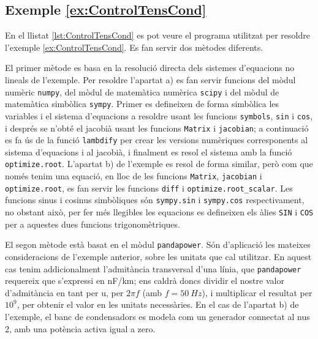 \hypertarget{exemple:ControlTensCond}{\subsection{Exemple \ref*{ex:ControlTensCond} \ControlTensCond}}
En el llistat \vref{lst:ControlTensCond} es pot veure el programa utilitzat per resoldre l'exemple \vref{ex:ControlTensCond}. Es fan servir dos mètodes diferents.

El primer mètode es basa en la resolució directa dels sistemes d'equacions no lineals de l'exemple. Per resoldre l'apartat a)   es fan servir funcions del mòdul numèric \texttt{numpy}, del mòdul de matemàtica numèrica \texttt{scipy} i del mòdul de matemàtica simbòlica \texttt{sympy}. Primer es defineixen de forma simbòlica les variables i el sistema d'equacions a resoldre usant les funcions \texttt{symbols}, \texttt{sin} i \texttt{cos}, i després se n'obté el jacobià usant les funcions \texttt{Matrix} i \texttt{jacobian}; a continuació es fa ús de la funció  \texttt{lambdify} per crear les versions numèriques corresponents al sistema d'equacions i al jacobià, i finalment es resol el sistema amb la funció \texttt{optimize.root}. L'apartat b) de l'exemple es resol de forma similar, però com que només tenim una equació, en lloc de les funcions \texttt{Matrix}, \texttt{jacobian} i \texttt{optimize.root}, es fan servir les funcions \texttt{diff} i \texttt{optimize.root\_scalar}. Les funcions sinus i cosinus simbòliques són  \texttt{sympy.sin} i  \texttt{sympy.cos} respectivament, no obstant això,  per  fer més llegibles les equacions es defineixen els àlies \texttt{SIN} i \texttt{COS} per a aquestes dues funcions trigonomètriques.

El segon mètode està basat en el mòdul \texttt{pandapower}. Són d'aplicació les mateixes consideracions de l'exemple anterior, sobre les unitats que cal utilitzar. En aquest cas tenim addicionalment l'admitància transversal d'una línia, que \texttt{pandapower} requereix que s'expressi en \unit{nF/km}; ens caldrà doncs dividir el nostre valor d'admitància en tant per u, per $2 \pi f$ (amb $f = \qty{50}{Hz}$), i multiplicar el resultat per $10^9$, per obtenir el valor en les unitats necessàries. En el cas de l'apartat  b) de l'exemple, el banc de condensadors es modela com un generador connectat al nus 2, amb una potència activa  igual a zero.




